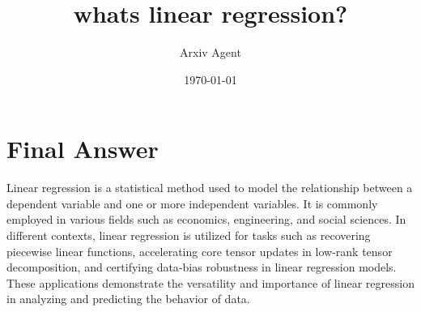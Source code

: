 \documentclass{article}%
\title{whats linear regression?}%
\author{Arxiv Agent}%
\date{\today}%
\begin{document}
%
\normalsize%
\maketitle%
\section{Final Answer}%
\label{sec:FinalAnswer}%
Linear regression is a statistical method used to model the relationship between a dependent variable and one or more independent variables. It is commonly employed in various fields such as economics, engineering, and social sciences. In different contexts, linear regression is utilized for tasks such as recovering piecewise linear functions, accelerating core tensor updates in low{-}rank tensor decomposition, and certifying data{-}bias robustness in linear regression models. These applications demonstrate the versatility and importance of linear regression in analyzing and predicting the behavior of data.

%
\end{document}
